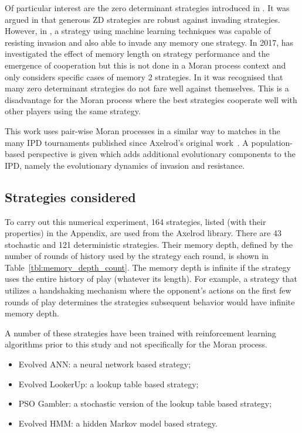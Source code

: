 \documentclass[10pt,letterpaper]{article}
\begin{document}
Of particular interest are the zero determinant strategies introduced in
\cite{Press2012}. It was argued in \cite{stewart2013extortion} that generous
ZD strategies are robust against invading strategies. However, in \cite{Lee2015},
a strategy using machine learning techniques was capable of resisting invasion
and also able to invade any memory one strategy. In 2017, \cite{Hilbe2017}
has investigated the effect of memory length on strategy performance and the
emergence of cooperation but this is not done in a Moran process context and only
considers specific cases of memory 2 strategies. In \cite{Adami2013} it was
recognised that many zero determinant strategies do not fare well against
themselves. This is a disadvantage for the Moran process where the best
strategies cooperate well with other players using the same strategy.

This work uses pair-wise Moran processes in a similar way to matches in the many
IPD tournaments published since Axelrod's original work~\cite{Axelrod1980a}.
A population-based perspective is given which adds additional
evolutionary components to the IPD, namely the evolutionary dynamics of invasion
and resistance.

\subsection*{Strategies considered}\label{sec:strategies}

To carry out this numerical experiment, 164
strategies, listed (with their properties) in the Appendix,
are used from the Axelrod library. There are
43 stochastic and
121 deterministic strategies. Their memory depth,
defined by the number of rounds of history used by the strategy each round, is
shown in Table~\ref{tbl:memory_depth_count}. The memory depth is infinite if the
strategy uses the entire history of play (whatever its length). For example, a
strategy that utilizes a handshaking mechanism where the opponent's actions on
the first few rounds of play determines the strategies subsequent behavior would
have infinite memory depth.

A number of these strategies have been trained with reinforcement learning
algorithms prior to this study and not specifically for the Moran process.

\begin{itemize}
    \item Evolved ANN: a neural network based strategy;
    \item Evolved LookerUp: a lookup table based strategy;
    \item PSO Gambler: a stochastic version of the lookup table based strategy;
    \item Evolved HMM: a hidden Markov model based strategy.
\end{itemize}
\end{document}
